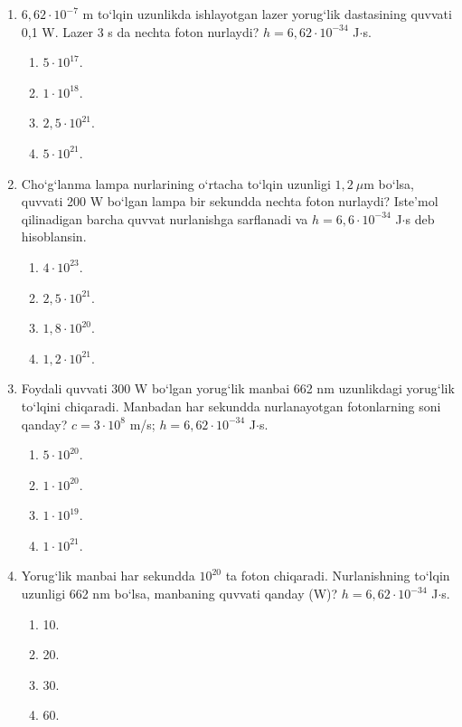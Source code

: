 \begin{enumerate}
\item $6,62\cdot 10^{-7}$ m to‘lqin uzunlikda ishlayotgan lazer yorug‘lik dastasining quvvati 0,1 W. Lazer 3 s da nechta foton nurlaydi? $h = 6,62\cdot 10^{-34}$ J$\cdot$s.
\begin{enumerate}[label=\Alph*)]
\item $5\cdot 10^{17}$.
\item $1\cdot 10^{18}$.
\item $2,5\cdot 10^{21}$.
\item $5\cdot 10^{21}$.
\end{enumerate}

\item Cho‘g‘lanma lampa nurlarining o‘rtacha to‘lqin uzunligi $1,2\ \mu$m bo‘lsa, quvvati 200 W bo‘lgan lampa bir sekundda nechta foton nurlaydi? Iste’mol qilinadigan barcha quvvat nurlanishga sarflanadi va $h = 6,6\cdot 10^{-34}$ J$\cdot$s deb hisoblansin.
\begin{enumerate}[label=\Alph*)]
\item $4\cdot 10^{23}$.
\item $2,5\cdot 10^{21}$.
\item $1,8\cdot 10^{20}$.
\item $1,2\cdot 10^{21}$.
\end{enumerate}

\item Foydali quvvati 300 W bo‘lgan yorug‘lik manbai 662 nm uzunlikdagi yorug‘lik to‘lqini chiqaradi. Manbadan har sekundda nurlanayotgan fotonlarning soni qanday? $c = 3\cdot 10^8$ m/s; $h = 6,62\cdot 10^{-34}$ J$\cdot$s.
\begin{enumerate}[label=\Alph*)]
\item $5\cdot 10^{20}$.
\item $1\cdot 10^{20}$.
\item $1\cdot 10^{19}$.
\item $1\cdot 10^{21}$.
\end{enumerate}

\item Yorug‘lik manbai har sekundda $10^{20}$ ta foton chiqaradi. Nurlanishning to‘lqin uzunligi 662 nm bo‘lsa, manbaning quvvati qanday (W)? $h = 6,62\cdot 10^{-34}$ J$\cdot$s.
\begin{enumerate}[label=\Alph*)]
\item 10.
\item 20.
\item 30.
\item 60.
\end{enumerate}


\end{enumerate}
